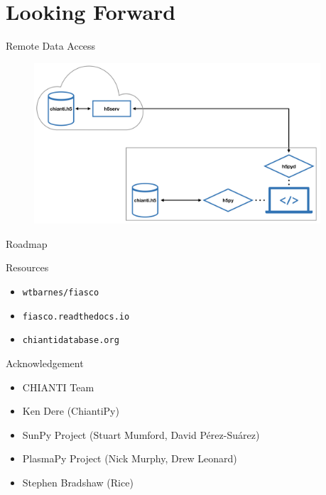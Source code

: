 \documentclass[12pt,aspectratio=169]{beamer}
\begin{document}
\section{Looking Forward}
\begin{frame}{Remote Data Access}
    \begin{figure}
        \centering
        \includegraphics[width=0.95\textwidth]{../figures/cloud_diagram.png}
    \end{figure}
\end{frame}
\begin{frame}{Roadmap}
\end{frame}
{%
\begin{frame}{Resources}
    \begin{itemize}
        \LARGE
        \item[] \texttt{wtbarnes/fiasco}
        \item[] \texttt{fiasco.readthedocs.io}
        \item[] \texttt{chiantidatabase.org}   
    \end{itemize}
\end{frame}
}
\begin{frame}{Acknowledgement}
    \begin{itemize}
        \item CHIANTI Team
        \item Ken Dere (ChiantiPy)
        \item SunPy Project (Stuart Mumford, David Pérez-Suárez)
        \item PlasmaPy Project (Nick Murphy, Drew Leonard)
        \item Stephen Bradshaw (Rice)
    \end{itemize}
\end{frame}
\end{document}
